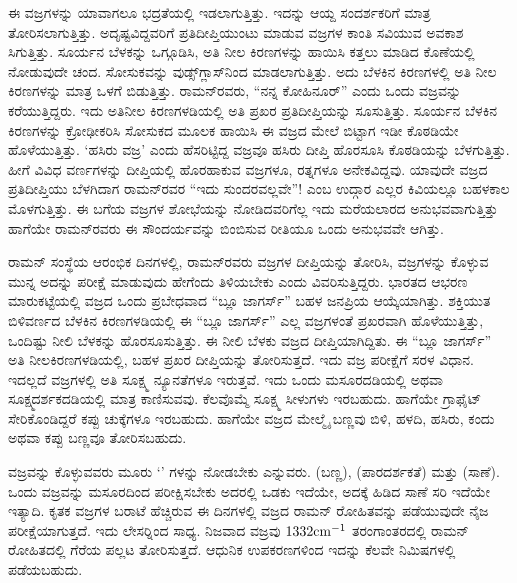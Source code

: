\vskip 2pt

ಈ ವಜ್ರಗಳನ್ನು ಯಾವಾಗಲೂ ಭದ್ರತೆಯಲ್ಲಿ ಇಡಲಾಗುತ್ತಿತ್ತು. ಇದನ್ನು ಆಯ್ದ ಸಂದರ್ಶಕರಿಗೆ ಮಾತ್ರ ತೋರಿಸಲಾಗುತ್ತಿತ್ತು. ಅದೃಷ್ಟವಿದ್ದವರಿಗೆ ಪ್ರತಿದೀಪ್ತಿಯುಂಟು ಮಾಡುವ ವಜ್ರಗಳ ಕಾಂತಿ ಸವಿಯುವ ಅವಕಾಶ ಸಿಗುತ್ತಿತ್ತು. ಸೂರ್ಯನ ಬೆಳಕನ್ನು ಒಗ್ಗೂಡಿಸಿ, ಅತಿ ನೀಲ ಕಿರಣಗಳನ್ನು ಹಾಯಿಸಿ ಕತ್ತಲು ಮಾಡಿದ ಕೊಣೆಯಲ್ಲಿ ನೋಡುವುದೇ ಚಂದ. ಸೋಸುಕವನ್ನು ವುಡ್ಸ್‌ಗ್ಲಾಸ್‍ನಿಂದ ಮಾಡಲಾಗುತ್ತಿತ್ತು. ಅದು ಬೆಳಕಿನ ಕಿರಣಗಳಲ್ಲಿ ಅತಿ ನೀಲ ಕಿರಣಗಳನ್ನು ಮಾತ್ರ ಒಳಗೆ ಬಿಡುತ್ತಿತ್ತು. ರಾಮನ್‍ರವರು, “ನನ್ನ ಕೋಹಿನೂರ್” ಎಂದು ಒಂದು ವಜ್ರವನ್ನು ಕರೆಯುತ್ತಿದ್ದರು. ಇದು ಅತಿನೀಲ ಕಿರಣಗಳಡಿಯಲ್ಲಿ ಅತಿ ಪ್ರಖರ ಪ್ರತಿದೀಪ್ತಿಯನ್ನು ಸೂಸುತ್ತಿತ್ತು. ಸೂರ್ಯನ ಬೆಳಕಿನ ಕಿರಣಗಳನ್ನು ಕ್ರೋಢೀಕರಿಸಿ ಸೋಸುಕದ ಮೂಲಕ ಹಾಯಿಸಿ ಈ ವಜ್ರದ ಮೇಲೆ ಬಿಟ್ಟಾಗ ಇಡೀ ಕೊಠಡಿಯೇ ಹೊಳೆಯುತ್ತಿತ್ತು. ‘ಹಸಿರು ವಜ್ರ’ ಎಂದು ಹೆಸರಿಟ್ಟಿದ್ದ ವಜ್ರವೂ ಹಸಿರು ದೀಪ್ತಿ ಹೊರಸೂಸಿ ಕೊಠಡಿಯನ್ನು ಬೆಳಗುತ್ತಿತ್ತು. ಹೀಗೆ ವಿವಿಧ ವರ್ಣಗಳನ್ನು ದೀಪ್ತಿಯಲ್ಲಿ ಹೊರಹಾಕುವ ವಜ್ರಗಳೂ, ರತ್ನಗಳೂ ಅನೇಕವಿದ್ದವು. ಯಾವುದೇ ವಜ್ರದ ಪ್ರತಿದೀಪ್ತಿಯು ಬೆಳಗಿದಾಗ ರಾಮನ್‍ರವರ “ಇದು ಸುಂದರವಲ್ಲವೇ”! ಎಂಬ ಉದ್ಗಾರ ಎಲ್ಲರ ಕಿವಿಯಲ್ಲೂ ಬಹಳಕಾಲ ಮೊಳಗುತ್ತಿತ್ತು. ಈ ಬಗೆಯ ವಜ್ರಗಳ ಶೋಭೆಯನ್ನು ನೋಡಿದವರಿಗೆಲ್ಲ ಇದು ಮರೆಯಲಾರದ ಅನುಭವವಾಗುತ್ತಿತ್ತು ಹಾಗೆಯೇ ರಾಮನ್‍ರವರು ಈ ಸೌಂದರ್ಯವನ್ನು ಬಿಂಬಿಸುವ ರೀತಿಯೂ ಒಂದು ಅನುಭವವೇ ಆಗಿತ್ತು.

\vskip 2pt

ರಾಮನ್ ಸಂಸ್ಥೆಯ ಆರಂಭಿಕ ದಿನಗಳಲ್ಲಿ, ರಾಮನ್‍ರವರು ವಜ್ರಗಳ ದೀಪ್ತಿಯನ್ನು ತೋರಿಸಿ, ವಜ್ರಗಳನ್ನು ಕೊಳ್ಳುವ ಮುನ್ನ ಅದನ್ನು ಪರೀಕ್ಷೆ ಮಾಡುವುದು ಹೇಗೆಂದು ತಿಳಿಯಬೇಕು ಎಂದು ವಿವರಿಸುತ್ತಿದ್ದರು. ಭಾರತದ ಆಭರಣ ಮಾರುಕಟ್ಟೆಯಲ್ಲಿ ವಜ್ರದ ಒಂದು ಪ್ರಬೇಧವಾದ “ಬ್ಲೂ ಜಾಗರ್ಸ್” ಬಹಳ ಜನಪ್ರಿಯ ಆಯ್ಕೆಯಾಗಿತ್ತು. ಶಕ್ತಿಯುತ ಬಿಳಿವರ್ಣದ ಬೆಳಕಿನ ಕಿರಣಗಳಡಿಯಲ್ಲಿ ಈ “ಬ್ಲೂ ಜಾಗರ್ಸ್” ಎಲ್ಲ ವಜ್ರಗಳಂತೆ ಪ್ರಖರವಾಗಿ ಹೊಳೆಯುತ್ತಿತ್ತು, ಒಂದಿಷ್ಟು ನೀಲಿ ಬೆಳಕನ್ನು ಹೊರಸೂಸುತ್ತಿತ್ತು. ಈ ನೀಲಿ ಬೆಳಕು ವಜ್ರದ ದೀಪ್ತಿಯಾಗಿದ್ದಿತು. ಈ “ಬ್ಲೂ ಜಾಗರ್ಸ್” ಅತಿ ನೀಲಕಿರಣಗಳಡಿಯಲ್ಲಿ, ಬಹಳ ಪ್ರಖರ ದೀಪ್ತಿಯನ್ನು ತೋರಿಸುತ್ತದೆ. ಇದು ವಜ್ರ ಪರೀಕ್ಷೆಗೆ ಸರಳ ವಿಧಾನ. ಇದಲ್ಲದೆ ವಜ್ರಗಳಲ್ಲಿ ಅತಿ ಸೂಕ್ಷ್ಮ ನ್ಯೂನತೆಗಳೂ ಇರುತ್ತವೆ. ಇದು ಒಂದು ಮಸೂರದಡಿಯಲ್ಲಿ ಅಥವಾ ಸೂಕ್ಷ್ಮದರ್ಶಕದಡಿಯಲ್ಲಿ ಮಾತ್ರ ಕಾಣಿಸುವವು. ಕೆಲವೊಮ್ಮೆ ಸೂಕ್ಷ್ಮ ಸೀಳುಗಳು ಇರಬಹುದು. ಹಾಗೆಯೇ ಗ್ರಾಫೈಟ್ ಸೇರಿಕೊಂಡಿದ್ದರೆ ಕಪ್ಪು ಚುಕ್ಕೆಗಳೂ ಇರಬಹುದು. ಹಾಗೆಯೇ ವಜ್ರದ ಮೇಲ್ಮೈ ಬಣ್ಣವು ಬಿಳಿ, ಹಳದಿ, ಹಸಿರು, ಕಂದು ಅಥವಾ ಕಪ್ಪು ಬಣ್ಣವೂ ತೋರಿಸಬಹುದು.

\vskip 2pt

ವಜ್ರವನ್ನು ಕೊಳ್ಳುವವರು ಮೂರು ‘’ ಗಳನ್ನು ನೋಡಬೇಕು ಎನ್ನುವರು.  (ಬಣ್ಣ),  (ಪಾರದರ್ಶಕತೆ) ಮತ್ತು  (ಸಾಣೆ). ಒಂದು ವಜ್ರವನ್ನು  ಮಸೂರದಿಂದ ಪರೀಕ್ಷಿಸಬೇಕು ಅದರಲ್ಲಿ ಒಡಕು ಇದೆಯೇ, ಅದಕ್ಕೆ ಹಿಡಿದ ಸಾಣೆ ಸರಿ ಇದೆಯೇ ಇತ್ಯಾದಿ. ಕೃತಕ ವಜ್ರಗಳ ಬರಾಟೆ ಹೆಚ್ಚಿರುವ ಈ ದಿನಗಳಲ್ಲಿ ವಜ್ರದ ರಾಮನ್ ರೋಹಿತವನ್ನು ಪಡೆಯುವುದೇ ನೈಜ ಪರೀಕ್ಷೆಯಾಗುತ್ತದೆ. ಇದು ಲೇಸರ್‍ನಿಂದ ಸಾಧ್ಯ. ನಿಜವಾದ ವಜ್ರವು $1332 {\rm cm}^{-1}$ ತರಂಗಾಂತರದಲ್ಲಿ ರಾಮನ್ ರೋಹಿತದಲ್ಲಿ ಗೆರೆಯ ಪಲ್ಲಟ ತೋರಿಸುತ್ತದೆ. ಆಧುನಿಕ ಉಪಕರಣಗಳಿಂದ ಇದನ್ನು ಕೆಲವೇ ನಿಮಿಷಗಳಲ್ಲಿ ಪಡೆಯಬಹುದು.

